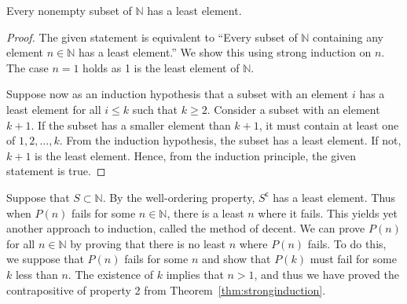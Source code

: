 \documentclass[../main.tex]{subfiles}
\begin{document}
\begin{prop} 
    Every nonempty subset of $\mathbb N$ has a least element.
\end{prop}
\begin{proof}
    The given statement is equivalent to ``Every subset of $\mathbb N$ containing any element $n \in \mathbb N$ has a least element.''
    We show this using strong induction on $n$.
    The case $n = 1$ holds as 1 is the least element of $\mathbb N$.

    Suppose now as an induction hypothesis that a subset with an element $i$ has a least element for all $i \leq k$ such that $k \geq 2$.
    Consider a subset with an element $k + 1$.
    If the subset has a smaller element than $k + 1$, it must contain at least one of $1, 2, \dots, k$.
    From the induction hypothesis, the subset has a least element.
    If not, $k + 1$ is the least element.
    Hence, from the induction principle, the given statement is true.
\end{proof}

Suppose that $S \subset \mathbb N$.
By the well-ordering property, $S^\mathsf{c}$ has a least element.
Thus when $P(n)$ fails for some $n \in \mathbb N$, there is a least $n$ where it fails.
This yields yet another approach to induction, called the \textsf{method of decent}.
We can prove $P(n)$ for all $n \in \mathbb N$ by proving that there is no least $n$ where $P(n)$ fails.
To do this, we suppose that $P(n)$ fails for some $n$ and show that $P(k)$ must fail for some $k$ less than $n$.
The existence of $k$ implies that $n > 1$, and thus we have proved the contrapositive of property 2 from Theorem~\ref{thm:stronginduction}.
\end{document}
